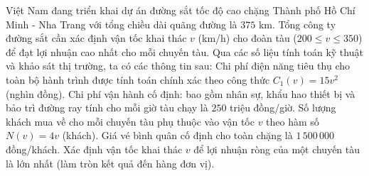 \begin{ex}%
	Việt Nam đang triển khai dự án đường sắt tốc độ cao chặng Thành phố Hồ Chí Minh - Nha Trang với tổng chiều dài quãng đường là $375$ km. Tổng công ty đường sắt cần xác định vận tốc khai thác $v$ (km/h) cho đoàn tàu ($200 \le v \le 350$) để đạt lợi nhuận cao nhất cho mỗi chuyến tàu. Qua các số liệu tính toán kỹ thuật và khảo sát thị trường, ta có các thông tin sau: Chi phí điện năng tiêu thụ cho toàn bộ hành trình  được tính toán chính xác theo công thức $C_1(v)=15v^2$ (nghìn đồng). Chi phí vận hành cố định: bao gồm nhân sự, khẩu hao thiết bị và bảo trì đường ray tính cho mỗi giờ tàu chạy là $250$ triệu đồng/giờ. Số lượng khách mua về cho mỗi chuyến tàu phụ thuộc vào vận tốc $v$ theo hàm số $N(v)=4v$ (khách). Giá vé bình quân cố định cho toàn chặng là $1\,500\,000$ đồng/khách. Xác định vận tốc khai thác $v$ để lợi nhuận ròng của một chuyến tàu là lớn nhất (làm tròn kết quả đến hàng đơn vị).
\end{ex}
